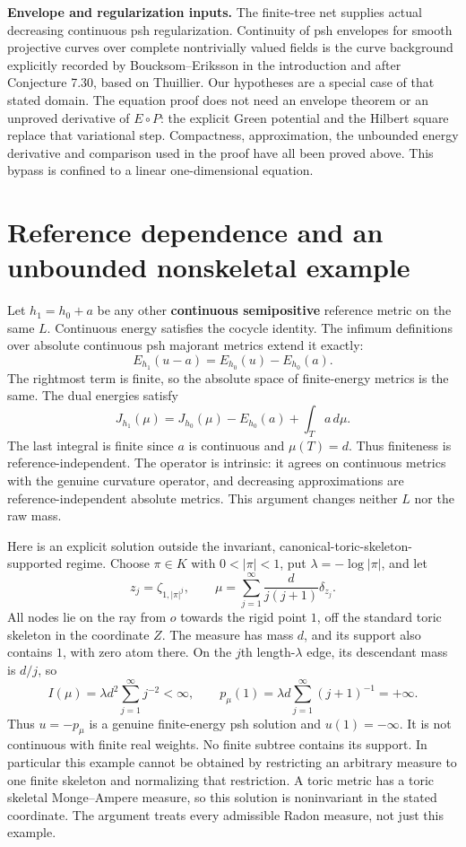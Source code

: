 \documentclass[
  11pt,
]{article}
\begin{document}
\textbf{Envelope and regularization inputs.} The finite-tree net
supplies actual decreasing continuous psh regularization. Continuity of
psh envelopes for smooth projective curves over complete nontrivially
valued fields is the curve background explicitly recorded by
Boucksom--Eriksson in the introduction and after Conjecture 7.30, based
on Thuillier. Our hypotheses are a special case of that stated domain.
The equation proof does not need an envelope theorem or an unproved
derivative of \(E\circ P\): the explicit Green potential and the Hilbert
square replace that variational step. Compactness, approximation, the
unbounded energy derivative and comparison used in the proof have all
been proved above. This bypass is confined to a linear one-dimensional
equation.

\section{Reference dependence and an unbounded nonskeletal
example}\label{reference-dependence-and-an-unbounded-nonskeletal-example}

Let \(h_1=h_0+a\) be any other \textbf{continuous semipositive}
reference metric on the same \(L\). Continuous energy satisfies the
cocycle identity. The infimum definitions over absolute continuous psh
majorant metrics extend it exactly: \[
E_{h_1}(u-a)=E_{h_0}(u)-E_{h_0}(a).
\] The rightmost term is finite, so the absolute space of finite-energy
metrics is the same. The dual energies satisfy \[
J_{h_1}(\mu)=J_{h_0}(\mu)-E_{h_0}(a)+\int_T a\,d\mu.
\] The last integral is finite since \(a\) is continuous and
\(\mu(T)=d\). Thus finiteness is reference-independent. The operator is
intrinsic: it agrees on continuous metrics with the genuine curvature
operator, and decreasing approximations are reference-independent
absolute metrics. This argument changes neither \(L\) nor the raw mass.

Here is an explicit solution outside the invariant,
canonical-toric-skeleton-supported regime. Choose \(\pi\in K\) with
\(0<|\pi|<1\), put \(\lambda=-\log|\pi|\), and let \[
z_j=\zeta_{1,|\pi|^j},\qquad
\mu=\sum_{j=1}^{\infty}\frac{d}{j(j+1)}\delta_{z_j}.
\] All nodes lie on the ray from \(o\) towards the rigid point \(1\),
off the standard toric skeleton in the coordinate \(Z\). The measure has
mass \(d\), and its support also contains \(1\), with zero atom there.
On the \(j\)th length-\(\lambda\) edge, its descendant mass is \(d/j\),
so \[
I(\mu)=\lambda d^2\sum_{j=1}^{\infty}j^{-2}<\infty,
\qquad
p_\mu(1)=\lambda d\sum_{j=1}^{\infty}(j+1)^{-1}=+\infty.
\] Thus \(u=-p_\mu\) is a genuine finite-energy psh solution and
\(u(1)=-\infty\). It is not continuous with finite real weights. No
finite subtree contains its support. In particular this example cannot
be obtained by restricting an arbitrary measure to one finite skeleton
and normalizing that restriction. A toric metric has a toric skeletal
Monge--Ampere measure, so this solution is noninvariant in the stated
coordinate. The argument treats every admissible Radon measure, not just
this example.
\end{document}
